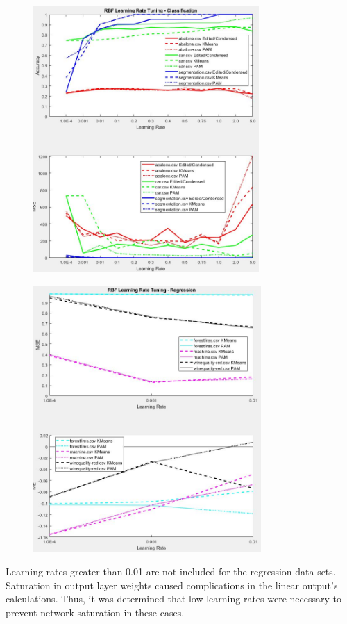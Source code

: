 \documentclass[twoside,11pt]{article}
\begin{document}
\begin{figure}[h]
	\centering
	\includegraphics[height=4in]{FINAL_FIGS/RBF_LR_TUNING_CLASS.JPG}
\end{figure}
\begin{figure}[h]
	\centering
	\includegraphics[height=4in]{FINAL_FIGS/RBF_LR_TUNING_REG.JPG}
\end{figure}

Learning rates greater than 0.01 are not included for the regression data sets. Saturation in output layer weights caused complications in the linear output's calculations. Thus, it was determined that low learning rates were necessary to prevent network saturation in these cases.
\end{document}
